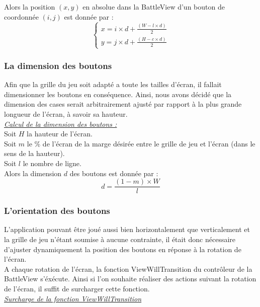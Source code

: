 \documentclass{article}
\begin{document}
\noindent Alors la position $(x,y)$ en absolue dans la BattleView d'un bouton de coordonnée $(i,j)$ est donnée par :\\

$$
\left\{
    \begin{array}{ll}
        x=i\times d+\frac{(W-l\times d)}{2} \\
        y=j\times d+\frac{(H-c\times d)}{2}
    \end{array}
\right.
$$

\subsubsection{La dimension des boutons}

Afin que la grille du jeu soit adapté a toute les tailles d'écran, il fallait dimensionner les boutons en conséquence. Ainsi, nous avons décidé que la dimension des cases serait arbitrairement ajusté par rapport à la plus grande longueur de l'écran, à savoir sa hauteur.\\

\noindent \underline{\textit{Calcul de la dimension des boutons :}}\\
Soit $H$ la hauteur de l'écran.\\
Soit $m$ le \% de l'écran de la marge désirée entre le grille de jeu et l'écran (dans le sens de la hauteur).\\
Soit $l$  le nombre de ligne.\\

\noindent Alors la dimension $d$ des boutons est donnée par : 
$$d = \frac {(1 - m)\times W }{l}$$


\subsubsection{L'orientation des boutons}

L'application pouvant être joué aussi bien horizontalement que verticalement et la grille de jeu n'étant soumise à aucune contrainte, il était donc nécessaire d'ajuster dynamiquement la position des boutons en réponse à la rotation de l'écran. \\

A chaque rotation de l'écran, la fonction ViewWillTransition du contrôleur de la BattleView s'éxécute. Ainsi si l'on souhaite réaliser des actions suivant la rotation de l'écran, il suffit de surcharger cette fonction. \\


\noindent \underline{\textit{Surcharge de la fonction ViewWillTransition}}
\end{document}
